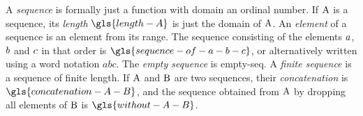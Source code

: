 
A \emph{sequence} is formally just a function with domain an ordinal number.
If $\mathrm{A}$ is a sequence, its \emph{length} $\gls{length-A}$ is just the domain
of $\mathrm{A}$.
An \emph{element} of a sequence is an element from its range.
The sequence consisting of the elements $a$, $b$ and $c$ in that order is
$\gls{sequence-of-a-b-c}$, or alternatively written using a word notation $abc$.
The \emph{empty sequence} is \gls{empty-seq}.
A \emph{finite sequence} is a sequence of finite length.
If $\mathrm{A}$ and $\mathrm{B}$ are two sequences, their \emph{concatenation}
is $\gls{concatenation-A-B}$, and the sequence obtained from $\mathrm{A}$ by
dropping all elements of $\mathrm{B}$ is $\gls{without-A-B}$.